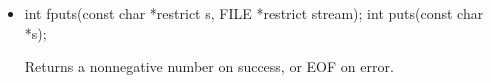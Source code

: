 \documentclass{report}
\begin{document}
\begin{itemize}
\begin{cppcode}
                int fputc(int c, FILE *stream);
                int putc(int c, FILE *stream);
                int putchar(int c);
            \end{cppcode}
            \bigbreak \noindent 
            Return the character written as an unsigned char cast to an int or EOF on error.
        \item \bigbreak \noindent 
            \begin{cppcode}
                int fputs(const char *restrict s, FILE *restrict stream);
                int puts(const char *s);
            \end{cppcode}
            \bigbreak \noindent 
            Returns a nonnegative number on success, or EOF on error.



    \end{itemize}

    \pagebreak 
\end{document}
